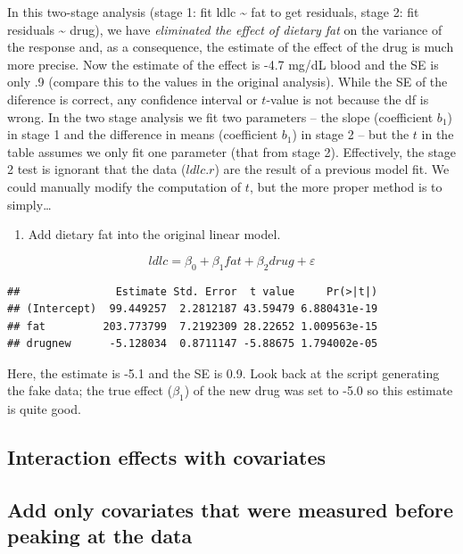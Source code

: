 \documentclass[]{book}
\providecommand{\tightlist}{%
  \setlength{\itemsep}{0pt}\setlength{\parskip}{0pt}}
\begin{document}
In this two-stage analysis (stage 1: fit ldlc \textasciitilde{} fat to
get residuals, stage 2: fit residuals \textasciitilde{} drug), we have
\emph{eliminated the effect of dietary fat} on the variance of the
response and, as a consequence, the estimate of the effect of the drug
is much more precise. Now the estimate of the effect is -4.7 mg/dL blood
and the SE is only .9 (compare this to the values in the original
analysis). While the SE of the diference is correct, any confidence
interval or \(t\)-value is not because the df is wrong. In the two stage
analysis we fit two parameters -- the slope (coefficient \(b_1\)) in
stage 1 and the difference in means (coefficient \(b_1\)) in stage 2 --
but the \(t\) in the table assumes we only fit one parameter (that from
stage 2). Effectively, the stage 2 test is ignorant that the data
(\(ldlc.r\)) are the result of a previous model fit. We could manually
modify the computation of \(t\), but the more proper method is to
simply\ldots{}

\begin{enumerate}
\def\labelenumi{\arabic{enumi}.}
\setcounter{enumi}{2}
\tightlist
\item
  Add dietary fat into the original linear model.
\end{enumerate}

\begin{equation}
ldlc = \beta_0 + \beta_1 fat + \beta_2 drug + \varepsilon
\end{equation}

\begin{verbatim}
##               Estimate Std. Error  t value     Pr(>|t|)
## (Intercept)  99.449257  2.2812187 43.59479 6.880431e-19
## fat         203.773799  7.2192309 28.22652 1.009563e-15
## drugnew      -5.128034  0.8711147 -5.88675 1.794002e-05
\end{verbatim}

Here, the estimate is -5.1 and the SE is 0.9. Look back at the script
generating the fake data; the true effect (\(\beta_1\)) of the new drug
was set to -5.0 so this estimate is quite good.

\subsection{Interaction effects with
covariates}\label{interaction-effects-with-covariates}

\subsection{Add only covariates that were measured before peaking at the
data}\label{add-only-covariates-that-were-measured-before-peaking-at-the-data}
\end{document}

